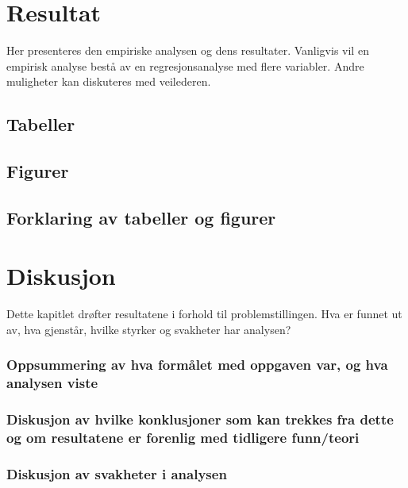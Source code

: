 \documentclass[
  12pt,
  a4paper,
  DIV=11,
  numbers=noendperiod]{scrartcl}
\begin{document}
\newpage

\section{Resultat}\label{resultat}

Her presenteres den empiriske analysen og dens resultater. Vanligvis vil
en empirisk analyse bestå av en regresjonsanalyse med flere variabler.
Andre muligheter kan diskuteres med veilederen.

\subsection{Tabeller}\label{tabeller}

\subsection{Figurer}\label{figurer}

\subsection{Forklaring av tabeller og
figurer}\label{forklaring-av-tabeller-og-figurer}

\newpage

\section{Diskusjon}\label{diskusjon}

Dette kapitlet drøfter resultatene i forhold til problemstillingen. Hva
er funnet ut av, hva gjenstår, hvilke styrker og svakheter har analysen?

\subsubsection{Oppsummering av hva formålet med oppgaven var, og hva
analysen
viste}\label{oppsummering-av-hva-formuxe5let-med-oppgaven-var-og-hva-analysen-viste}

\subsubsection{Diskusjon av hvilke konklusjoner som kan trekkes fra
dette og om resultatene er forenlig med tidligere
funn/teori}\label{diskusjon-av-hvilke-konklusjoner-som-kan-trekkes-fra-dette-og-om-resultatene-er-forenlig-med-tidligere-funnteori}

\subsubsection{Diskusjon av svakheter i
analysen}\label{diskusjon-av-svakheter-i-analysen}
\end{document}
